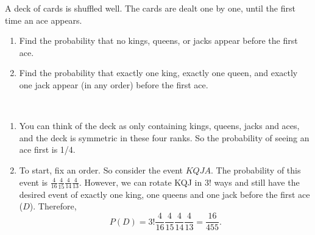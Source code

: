 
\setcounter{theorem}{18}
\begin{exercise}[BH.1.37]
	A deck of cards is shuffled well. The cards are dealt one by one, until the first time an ace appears.
	\begin{enumerate}
		\item Find the probability that no kings, queens, or jacks appear before the first ace.
		\item Find the probability that exactly one king, exactly one queen, and exactly one jack appear (in any order) before the first ace.
	\end{enumerate}
\begin{solution}~
	\begin{enumerate}
		\item You can think of the deck as only containing kings, queens, jacks and aces, and the deck is symmetric in these four ranks. So the probability of seeing an ace first is 1/4.
		\item To start, fix an order. So consider the event $KQJA$.  The probability of this event is $\frac{4}{16}\frac{4}{15}\frac{4}{14}\frac{4}{13}$. However, we can rotate KQJ in $3!$ ways and still have the desired event of exactly one king, one queens and one jack before the first ace ($D$). Therefore,
			$$P(D) = 3!\frac{4}{16}\frac{4}{15}\frac{4}{14}\frac{4}{13}=\frac{16}{455}.$$
	\end{enumerate}
\end{solution}
\end{exercise}


